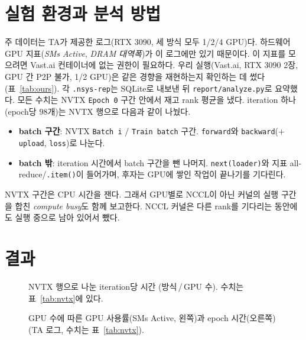 \documentclass[11pt,a4paper]{article}
\begin{document}
\section{실험 환경과 분석 방법}

주 데이터는 TA가 제공한 로그(RTX 3090, 세 방식 모두 1/2/4 GPU)다. 하드웨어 GPU 지표(\emph{SMs Active}, \emph{DRAM 대역폭})가 이 로그에만 있기
때문이다. 이 지표를 모으려면 Vast.ai 컨테이너에 없는 권한이 필요하다. 우리 실행(Vast.ai, RTX 3090 2장, GPU 간 P2P 불가, 1/2 GPU)은 같은 경향을
재현하는지 확인하는 데 썼다(표~\ref{tab:ours}). 각 \texttt{.nsys-rep}는 SQLite로 내보낸 뒤 \texttt{report/analyze.py}로 요약했다. 모든 수치는 NVTX
\texttt{Epoch 0} 구간 안에서 재고 rank 평균을 냈다. iteration 하나(epoch당 98개)는 NVTX 행으로 다음과 같이 나눴다.
\begin{itemize}
\item \textbf{batch 구간}: NVTX \texttt{Batch i} / \texttt{Train batch} 구간. \texttt{forward}와 \texttt{backward}(+\,\texttt{upload}, \texttt{loss})로 나눈다.
\item \textbf{batch 밖}: iteration 시간에서 batch 구간을 뺀 나머지. \texttt{next(loader)}와 지표 all-reduce/\texttt{.item()}이 들어가며, 후자는 GPU에 쌓인 작업이 끝나기를 기다린다.
\end{itemize}
NVTX 구간은 CPU 시간을 잰다. 그래서 GPU별로 NCCL이 아닌 커널의 실행 구간을 합친 \emph{compute busy}도 함께 보고한다. NCCL 커널은 다른 rank를
기다리는 동안에도 실행 중으로 남아 있어서 뺐다.

\section{결과}

\begin{figure}[h]
\centering

\caption{NVTX 행으로 나눈 iteration당 시간 (방식\,/\,GPU 수). 수치는 표~\ref{tab:nvtx}에 있다.}
\label{fig:nvtx}
\end{figure}

\begin{table}[h]
\centering\small
\caption{NVTX 분해와 GPU 지표 (TA 로그, GPU 평균). fwd/bwd/outside = forward/backward/batch 밖, busy = epoch 동안 연산 커널이 실행된 비율.}
\label{tab:nvtx}

\end{table}

\begin{figure}[h]
\centering

\caption{GPU 수에 따른 GPU 사용률(SMs Active, 왼쪽)과 epoch 시간(오른쪽) (TA 로그, 수치는 표~\ref{tab:nvtx}).}
\label{fig:scaling}
\end{figure}
\end{document}
